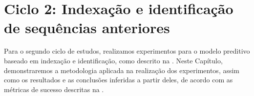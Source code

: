 \chapter{Ciclo 2: Indexação e identificação de sequências anteriores}
\label{chap:dtw}

Para o segundo ciclo de estudos, realizamos experimentos para o modelo preditivo baseado em indexação e identificação, como descrito na . Neste Capítulo, demonstraremos a metodologia aplicada na realização dos experimentos, assim como os resultados e as conclusões inferidas a partir deles, de acordo com as métricas de sucesso descritas na .